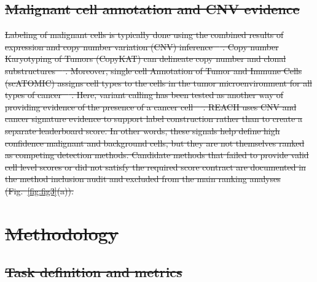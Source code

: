 \documentclass[10pt]{article}
\providecommand{\DIFdeltex}[1]{{\protect\color{red}\sout{#1}}}                      %
\providecommand{\DIFdel}[1]{\texorpdfstring{\DIFdeltex{#1}}{}} %
\begin{document}
\begin{enumerate}
\subsection{\DIFdel{Malignant cell annotation and CNV evidence}}
\addtocounter{subsection}{-1}%

\DIFdel{Labeling of malignant cells is typically done using the combined results of expression and copy number variation (CNV) inference \mbox{%
\cite{gao2021delineating}}\hskip0pt%
. Copy number Karyotyping of Tumors (CopyKAT) can delineate copy number and clonal substructures \mbox{%
\cite{gao2021delineating}}\hskip0pt%
. Moreover, single cell Annotation of Tumor and Immune Cells (scATOMIC) assigns cell types to the cells in the tumor microenvironment for all types of cancer \mbox{%
\cite{nofech2023pan}}\hskip0pt%
. Here, variant calling has been tested as another way of providing evidence of the presence of a cancer cell \mbox{%
\cite{gasper2022variant}}\hskip0pt%
. REACH uses CNV and cancer signature evidence to support label construction rather
  than to create a separate leaderboard score. In other words, these signals help define high confidence malignant and background cells, but they are not themselves ranked as competing detection methods. Candidate methods that failed to provide valid cell level scores or did not satisfy the required score contract are documented in the method inclusion audit and excluded from the main ranking analyses (Fig.~\ref{fig:fig3}(a)).
}%

\section{\DIFdel{Methodology}}
\addtocounter{section}{-1}%

\subsection{\DIFdel{Task definition and metrics}}
\addtocounter{subsection}{-1}%


\end{enumerate}
\end{document}
